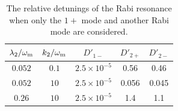 
\begin{table}
    \centering
    \small
    \setlength\tabcolsep{7pt}
    \begin{tabular}{c | c | c | c | c }
    \hline
    \hline
        $\lambda_2/\omega_\mathrm m$ & $k_2/\omega_\mathrm m$  & $D'_{1-}$ & $D'_{2+}$ & $D'_{2-}$ \\
    \hline
    $0.052$ & $0.1$ & $2.5\times 10^{-5}$ & 0.56 & 0.46 \\
    $0.052$ &  $10$ & $2.5\times 10^{-5}$ & 0.056 & 0.045  \\
    $0.26$ & $10$ &  $2.5\times 10^{-5}$ & 1.4 & 1.1 \\
    \hline
    \hline
    \end{tabular}
    \caption{\label{table:multi-frequency-rabi-simple-relative-detuning-destruction}The relative detunings of the Rabi resonance when only the $1+$ mode and another Rabi mode are considered.}
\end{table}




